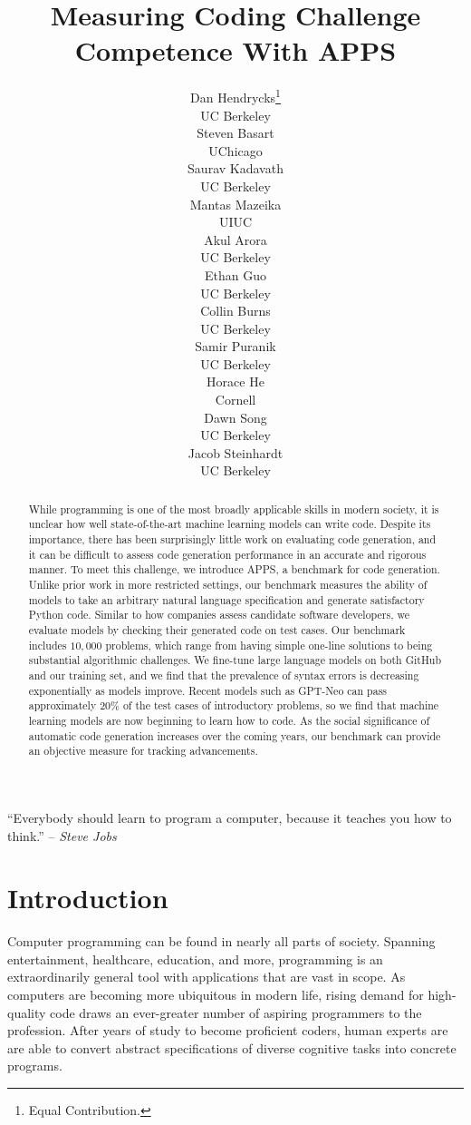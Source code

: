 \documentclass{article}
\title{Measuring Coding Challenge Competence With APPS}
\date{}
\author{Dan Hendrycks\thanks{Equal Contribution.}\\
UC Berkeley\\
\And
Steven Basart\printfnsymbol{1}\\
UChicago\\
\And
Saurav Kadavath\\
UC Berkeley\\
\And
Mantas Mazeika\\
UIUC\\
\And
Akul Arora\\
UC Berkeley\\
\And
Ethan Guo\\
UC Berkeley\\
\And
Collin Burns\\
UC Berkeley\\
\And
Samir Puranik\\
UC Berkeley\\
\And
Horace He\\
Cornell\\
\AND
Dawn Song\\
UC Berkeley\\
\And
Jacob Steinhardt\\
UC Berkeley\\
}
\begin{document}
\maketitle



\begin{abstract}
While programming is one of the most broadly applicable skills in modern society, it is unclear how well state-of-the-art machine learning models can write code. Despite its importance, there has been surprisingly little work on evaluating code generation, and it can be difficult to assess code generation performance in an accurate and rigorous manner. To meet this challenge, we introduce APPS, a benchmark for code generation. Unlike prior work in more restricted settings, our benchmark measures the ability of models to take an arbitrary natural language specification and generate satisfactory Python code. Similar to how companies assess candidate software developers, we evaluate models by checking their generated code on test cases. Our benchmark includes $10,\!000$ problems, which range from having simple one-line solutions to being substantial algorithmic challenges. We fine-tune large language models on both GitHub and our training set, and we find that the prevalence of syntax errors is decreasing exponentially as models improve. Recent models such as GPT-Neo can pass approximately $20\%$ of the test cases of introductory problems, so we find that machine learning models are now beginning to learn how to code. As the social significance of automatic code generation increases over the coming years, our benchmark can provide an objective measure for tracking advancements.
\end{abstract}


``Everybody should learn to program a computer, because it teaches you how to think.'' -- \emph{Steve Jobs}

\section{Introduction}
Computer programming can be found in nearly all parts of society. Spanning entertainment, healthcare, education, and more, programming is an extraordinarily general tool with applications that are vast in scope. As computers are becoming more ubiquitous in modern life, rising demand for high-quality code draws an ever-greater number of aspiring programmers to the profession. After years of study to become proficient coders, human experts are are able to convert abstract specifications of diverse cognitive tasks into concrete programs.
\end{document}
